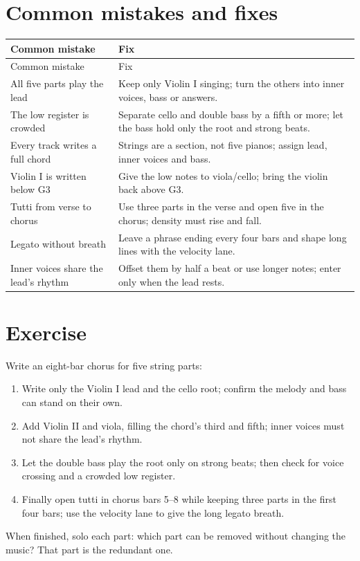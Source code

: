 \section{Common mistakes and fixes}
\label{sec:string-mistakes}

\begin{longtable}{p{}p{}}
\toprule
Common mistake & Fix \\
\midrule
\endfirsthead
\toprule
Common mistake & Fix \\
\midrule
\endhead
All five parts play the lead & Keep only Violin I singing; turn the others into inner voices, bass or answers. \\
The low register is crowded & Separate cello and double bass by a fifth or more; let the bass hold only the root and strong beats. \\
Every track writes a full chord & Strings are a section, not five pianos; assign lead, inner voices and bass. \\
Violin I is written below G3 & Give the low notes to viola/cello; bring the violin back above G3. \\
Tutti from verse to chorus & Use three parts in the verse and open five in the chorus; density must rise and fall. \\
Legato without breath & Leave a phrase ending every four bars and shape long lines with the velocity lane. \\
Inner voices share the lead's rhythm & Offset them by half a beat or use longer notes; enter only when the lead rests. \\
\bottomrule
\end{longtable}

\section{Exercise}
\label{sec:string-exercise}

\begin{exercise}
Write an eight-bar chorus for five string parts:
\begin{enumerate}
\item Write only the Violin I lead and the cello root; confirm the melody and bass can stand on their own.
\item Add Violin II and viola, filling the chord's third and fifth; inner voices must not share the lead's rhythm.
\item Let the double bass play the root only on strong beats; then check for voice crossing and a crowded low register.
\item Finally open tutti in chorus bars 5--8 while keeping three parts in the first four bars; use the velocity lane to give the long legato breath.
\end{enumerate}
When finished, solo each part: which part can be removed without changing the music? That part is the redundant one.
\end{exercise}

